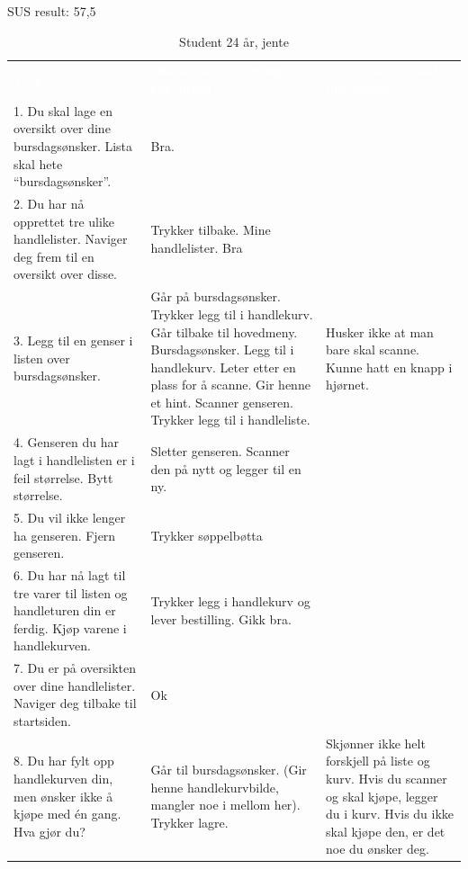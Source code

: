 \noindent SUS result: 57,5

\begin{table}[H]
    \caption{Student 24 år, jente}
    \label{tab:observasjon1_2}
    \centering
    \begin{tabular}{|L{15em}  L{15em} L{15em}|}
    \hline
        \textbf{\textcolor{white}{Task}} & \textbf{\textcolor{white}{Obeservation during execution}} & \textbf{\textcolor{white}{Conversation and discussion}}\\
        1. Du skal lage en oversikt over dine bursdagsønsker. Lista skal hete “bursdagsønsker”. & Bra. & \\
        2. Du har nå opprettet tre ulike handlelister. Naviger deg frem til en oversikt over disse. & Trykker tilbake. Mine handlelister. Bra &  \\
        3. Legg til en genser i listen over bursdagsønsker. & Går på bursdagsønsker. Trykker legg til i handlekurv. Går tilbake til hovedmeny. Bursdagsønsker. Legg til i handlekurv. Leter etter en plass for å scanne. Gir henne et hint. Scanner genseren. Trykker legg til i handleliste. & Husker ikke at man bare skal scanne. Kunne hatt en knapp i hjørnet.\\
        4. Genseren du har lagt i handlelisten er i feil størrelse. Bytt størrelse. & Sletter genseren. Scanner den på nytt og legger til en ny. & \\
        5. Du vil ikke lenger ha genseren. Fjern genseren. & Trykker søppelbøtta & \\
        6. Du har nå lagt til tre varer til listen og handleturen din er ferdig. Kjøp varene i handlekurven. & Trykker legg i handlekurv og lever bestilling. Gikk bra. & \\
        7. Du er på oversikten over dine handlelister. Naviger deg tilbake til startsiden. & Ok & \\
        8. Du har fylt opp handlekurven din, men ønsker ikke å kjøpe med én gang. Hva gjør du? & Går til bursdagsønsker. (Gir henne handlekurvbilde, mangler noe i mellom her). Trykker lagre. & Skjønner ikke helt forskjell på liste og kurv. Hvis du scanner og skal kjøpe, legger du i kurv. Hvis du ikke skal kjøpe den, er det noe du ønsker deg.\\
        \hline
    \end{tabular}
\end{table}

